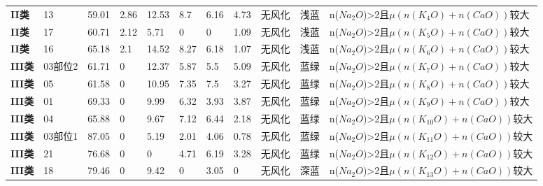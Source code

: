 \documentclass[withoutpreface,bwprint]{cumcmthesis} %
\begin{document}
\begin{appendices}
\begin{table}[!h]
\begin{tabular}{@{}lllllllllll@{}}
		\textbf{II类}  & 13             & 59.01               & 2.86               & 12.53             & 8.7               & 6.16                & 4.73              & 无风化           & 浅蓝          & n($Na_2O$)>2且$\mu (n(K_4O)+n(CaO))$较大  \\
		\textbf{II类}  & 17             & 60.71               & 2.12               & 5.71              & 0                 & 0                   & 1.09              & 无风化           & 浅蓝          & n($Na_2O$)>2且$\mu (n(K_5O)+n(CaO))$较大  \\
		\textbf{II类}  & 16             & 65.18               & 2.1                & 14.52             & 8.27              & 6.18                & 1.07              & 无风化           & 浅蓝          & n($Na_2O$)>2且$\mu (n(K_6O)+n(CaO))$较大  \\
		\textbf{III类} & 03部位2          & 61.71               & 0                  & 12.37             & 5.87              & 5.5                 & 5.09              & 无风化           & 蓝绿          & n($Na_2O$)>2且$\mu (n(K_7O)+n(CaO))$较大  \\
		\textbf{III类} & 05             & 61.58               & 0                  & 10.95             & 7.35              & 7.5                 & 3.27              & 无风化           & 蓝绿          & n($Na_2O$)>2且$\mu (n(K_8O)+n(CaO))$较大  \\
		\textbf{III类} & 01             & 69.33               & 0                  & 9.99              & 6.32              & 3.93                & 3.87              & 无风化           & 蓝绿          & n($Na_2O$)>2且$\mu (n(K_9O)+n(CaO))$较大  \\
		\textbf{III类} & 04             & 65.88               & 0                  & 9.67              & 7.12              & 6.44                & 2.18              & 无风化           & 蓝绿          & n($Na_2O$)>2且$\mu (n(K_10O)+n(CaO))$较大 \\
		\textbf{III类} & 03部位1          & 87.05               & 0                  & 5.19              & 2.01              & 4.06                & 0.78              & 无风化           & 蓝绿          & n($Na_2O$)>2且$\mu (n(K_11O)+n(CaO))$较大 \\
		\textbf{III类} & 21             & 76.68               & 0                  & 0                 & 4.71              & 6.19                & 3.28              & 无风化           & 蓝绿          & n($Na_2O$)>2且$\mu (n(K_12O)+n(CaO))$较大 \\
		\textbf{III类} & 18             & 79.46               & 0                  & 9.42              & 0                 & 3.05                & 0                 & 无风化           & 深蓝          & n($Na_2O$)>2且$\mu (n(K_13O)+n(CaO))$较大 \\

\end{tabular}
\end{table}
\end{appendices}
\end{document}
